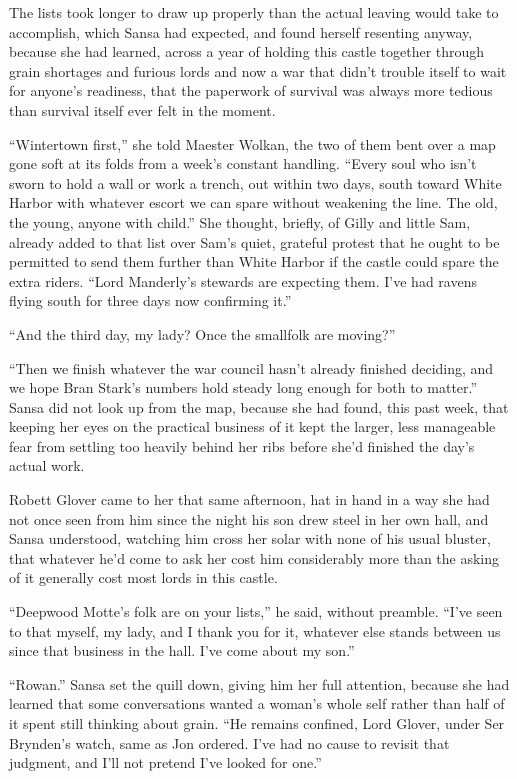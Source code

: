 The lists took longer to draw up properly than the actual leaving would take to accomplish, which Sansa had expected, and found herself resenting anyway, because she had learned, across a year of holding this castle together through grain shortages and furious lords and now a war that didn’t trouble itself to wait for anyone’s readiness, that the paperwork of survival was always more tedious than survival itself ever felt in the moment.

“Wintertown first,” she told Maester Wolkan, the two of them bent over a map gone soft at its folds from a week’s constant handling. “Every soul who isn’t sworn to hold a wall or work a trench, out within two days, south toward White Harbor with whatever escort we can spare without weakening the line. The old, the young, anyone with child.” She thought, briefly, of Gilly and little Sam, already added to that list over Sam’s quiet, grateful protest that he ought to be permitted to send them further than White Harbor if the castle could spare the extra riders. “Lord Manderly’s stewards are expecting them. I’ve had ravens flying south for three days now confirming it.”

“And the third day, my lady? Once the smallfolk are moving?”

“Then we finish whatever the war council hasn’t already finished deciding, and we hope Bran Stark’s numbers hold steady long enough for both to matter.” Sansa did not look up from the map, because she had found, this past week, that keeping her eyes on the practical business of it kept the larger, less manageable fear from settling too heavily behind her ribs before she’d finished the day’s actual work.

\sceneBreak

Robett Glover came to her that same afternoon, hat in hand in a way she had not once seen from him since the night his son drew steel in her own hall, and Sansa understood, watching him cross her solar with none of his usual bluster, that whatever he’d come to ask her cost him considerably more than the asking of it generally cost most lords in this castle.

“Deepwood Motte’s folk are on your lists,” he said, without preamble. “I’ve seen to that myself, my lady, and I thank you for it, whatever else stands between us since that business in the hall. I’ve come about my son.”

“Rowan.” Sansa set the quill down, giving him her full attention, because she had learned that some conversations wanted a woman’s whole self rather than half of it spent still thinking about grain. “He remains confined, Lord Glover, under Ser Brynden’s watch, same as Jon ordered. I’ve had no cause to revisit that judgment, and I’ll not pretend I’ve looked for one.”

